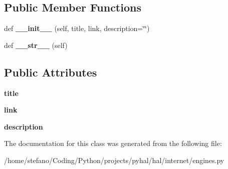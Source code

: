 \subsection*{Public Member Functions}
\begin{DoxyCompactItemize}
\item 
def {\bfseries \+\_\+\+\_\+init\+\_\+\+\_\+} (self, title, link, description=\char`\"{}\char`\"{})\hypertarget{classhal_1_1internet_1_1engines_1_1_search_engine_result_aafeb2e635cb5a9b381d5535c714d11c2}{}\label{classhal_1_1internet_1_1engines_1_1_search_engine_result_aafeb2e635cb5a9b381d5535c714d11c2}

\item 
def {\bfseries \+\_\+\+\_\+str\+\_\+\+\_\+} (self)\hypertarget{classhal_1_1internet_1_1engines_1_1_search_engine_result_aa65111d2c02c5e1d9d2b135d60eaeeac}{}\label{classhal_1_1internet_1_1engines_1_1_search_engine_result_aa65111d2c02c5e1d9d2b135d60eaeeac}

\end{DoxyCompactItemize}
\subsection*{Public Attributes}
\begin{DoxyCompactItemize}
\item 
{\bfseries title}\hypertarget{classhal_1_1internet_1_1engines_1_1_search_engine_result_ad5bf472925c771cddddc1ec8008cc6b2}{}\label{classhal_1_1internet_1_1engines_1_1_search_engine_result_ad5bf472925c771cddddc1ec8008cc6b2}

\item 
{\bfseries link}\hypertarget{classhal_1_1internet_1_1engines_1_1_search_engine_result_a87fd88d4579dd7be2fed559386cc58e8}{}\label{classhal_1_1internet_1_1engines_1_1_search_engine_result_a87fd88d4579dd7be2fed559386cc58e8}

\item 
{\bfseries description}\hypertarget{classhal_1_1internet_1_1engines_1_1_search_engine_result_a055578b70da89ea3248abb6aa27d92df}{}\label{classhal_1_1internet_1_1engines_1_1_search_engine_result_a055578b70da89ea3248abb6aa27d92df}

\end{DoxyCompactItemize}


The documentation for this class was generated from the following file\+:\begin{DoxyCompactItemize}
\item 
/home/stefano/\+Coding/\+Python/projects/pyhal/hal/internet/engines.\+py\end{DoxyCompactItemize}
